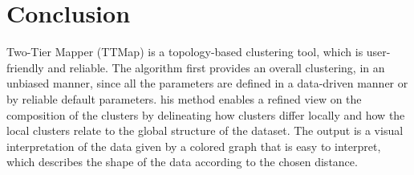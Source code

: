 \documentclass[a4paper,12pt]{article}
\begin{document}
%
\section{Conclusion}
Two-Tier Mapper (TTMap) is a topology-based clustering tool, which is user-friendly and reliable. The algorithm first provides an overall clustering, in an unbiased manner, since all the parameters are defined in a data-driven manner or by reliable default parameters. his method enables a refined view on the composition of the clusters by delineating
 how clusters differ locally and how the local clusters relate to the global structure of the dataset. The output is a visual interpretation of the data given by a colored graph that is easy to interpret, which describes the shape of the data according to the chosen distance. \\
 

%
\end{document}
